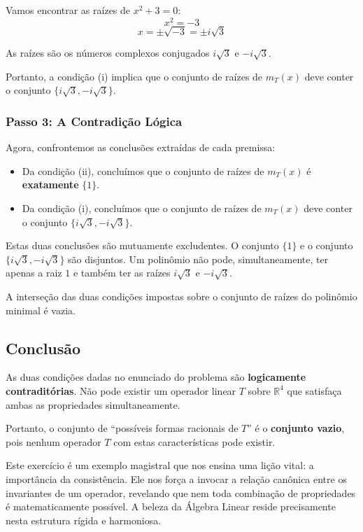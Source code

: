 Vamos encontrar as raízes de $x^2 + 3 = 0$:
\[
x^2 = -3
\]
\[
x = \pm \sqrt{-3} = \pm i\sqrt{3}
\]

As raízes são os números complexos conjugados $i\sqrt{3}$ e $-i\sqrt{3}$.

Portanto, a condição (i) implica que o conjunto de raízes de $m_T(x)$ deve conter o conjunto $\{i\sqrt{3}, -i\sqrt{3}\}$.

\subsubsection*{Passo 3: A Contradição Lógica}

Agora, confrontemos as conclusões extraídas de cada premissa:

\begin{itemize}
  \item Da condição (ii), concluímos que o conjunto de raízes de $m_T(x)$ é \textbf{exatamente} $\{1\}$.
  \item Da condição (i), concluímos que o conjunto de raízes de $m_T(x)$ deve conter o conjunto $\{i\sqrt{3}, -i\sqrt{3}\}$.
\end{itemize}

Estas duas conclusões são mutuamente excludentes. O conjunto $\{1\}$ e o conjunto $\{i\sqrt{3}, -i\sqrt{3}\}$ são disjuntos. Um polinômio não pode, simultaneamente, ter apenas a raiz $1$ e também ter as raízes $i\sqrt{3}$ e $-i\sqrt{3}$.

A interseção das duas condições impostas sobre o conjunto de raízes do polinômio minimal é vazia.

\subsection*{Conclusão}

As duas condições dadas no enunciado do problema são \textbf{logicamente contraditórias}. Não pode existir um operador linear $T$ sobre $\mathbb{R}^4$ que satisfaça ambas as propriedades simultaneamente.

Portanto, o conjunto de ``possíveis formas racionais de $T$'' é o \textbf{conjunto vazio}, pois nenhum operador $T$ com estas características pode existir.

Este exercício é um exemplo magistral que nos ensina uma lição vital: a importância da consistência. Ele nos força a invocar a relação canônica entre os invariantes de um operador, revelando que nem toda combinação de propriedades é matematicamente possível. A beleza da Álgebra Linear reside precisamente nesta estrutura rígida e harmoniosa.